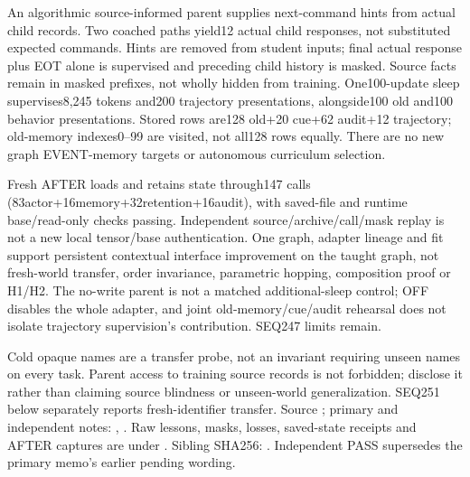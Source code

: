 \documentclass[11pt]{article}
\begin{document}
An algorithmic source-informed parent supplies next-command hints from actual
child records. Two coached paths yield12 actual child responses, not substituted
expected commands. Hints are removed from student inputs; final actual response
plus EOT alone is supervised and preceding child history is masked. Source
facts remain in masked prefixes, not wholly hidden from training. One100-update
sleep supervises8,245 tokens and200 trajectory presentations, alongside100 old
and100 behavior presentations. Stored rows are128 old+20 cue+62 audit+12
trajectory; old-memory indexes0--99 are visited, not all128 rows equally.
There are no new graph EVENT-memory targets or autonomous curriculum selection.

Fresh AFTER loads and retains state
through147 calls (83actor+16memory+32retention+16audit), with saved-file and
runtime base/read-only checks passing. Independent source/archive/call/mask
replay is not a new local tensor/base authentication. One graph, adapter lineage
and fit support persistent contextual interface improvement on the taught graph,
not fresh-world transfer, order invariance, parametric hopping, composition
proof or H1/H2. The no-write parent is not a matched additional-sleep control;
OFF disables the whole adapter, and joint old-memory/cue/audit rehearsal does
not isolate trajectory supervision's contribution. SEQ247 limits remain.

Cold opaque names are a transfer probe, not an invariant requiring unseen names
on every task. Parent access to training source records is not forbidden;
disclose it rather than claiming source blindness or unseen-world generalization.
SEQ251 below separately reports fresh-identifier transfer. Source
; primary and independent notes:
,
.
Raw lessons, masks, losses, saved-state receipts and AFTER captures are under
.
Sibling  SHA256:
.
Independent PASS supersedes the primary memo's earlier pending wording.
\end{document}
